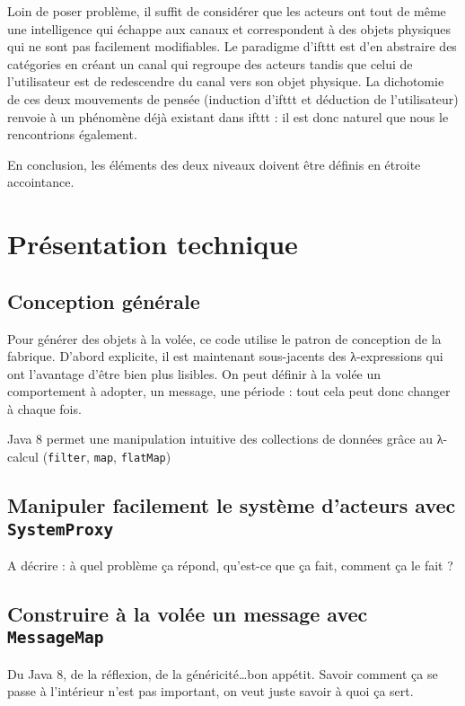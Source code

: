 \documentclass[11pt]{article}
\begin{document}
Loin de poser problème, il suffit de considérer que les acteurs ont tout de même une intelligence qui échappe aux canaux et correspondent à des objets physiques qui ne sont pas facilement modifiables. Le paradigme d'ifttt est d'en abstraire des catégories en créant un canal qui regroupe des acteurs tandis que celui de l'utilisateur est de redescendre du canal vers son objet physique. La dichotomie de ces deux mouvements de pensée (induction d'ifttt et déduction de l'utilisateur) renvoie à un phénomène déjà existant dans ifttt : il est donc naturel que nous le rencontrions également.

En conclusion, les éléments des deux niveaux doivent être définis en étroite accointance.

\section{Présentation technique}

\subsection{Conception générale}

Pour générer des objets à la volée, ce code utilise le patron de conception de la fabrique. D'abord explicite, il est maintenant sous-jacents des λ-expressions qui ont l'avantage d'être bien plus lisibles. On peut définir à la volée un comportement à adopter, un message, une période : tout cela peut donc changer à chaque fois. 

Java 8 permet une manipulation intuitive des collections de données grâce au λ-calcul (\texttt{filter}, \texttt{map}, \texttt{flatMap})

\subsection{Manipuler facilement le système d'acteurs avec \texttt{SystemProxy}}

A décrire : à quel problème ça répond, qu'est-ce que ça fait, comment ça le fait ?

\subsection{Construire à la volée un message avec \texttt{MessageMap}}

Du Java 8, de la réflexion, de la généricité\dots bon appétit. Savoir comment ça se passe à l'intérieur n'est pas important, on veut juste savoir à quoi ça sert.
\end{document}
